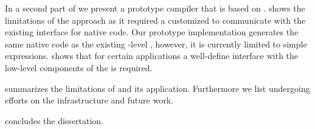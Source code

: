 \begin{description}
	In a second part of  we present \NBJ a prototype \JIT compiler that is based on \B.
	\NBJ shows the limitations of the \B approach as it required a customized \VM to communicate with the existing \JIT interface for native code.
	Our prototype implementation generates the same native code as the existing \VM-level \JIT, however, it is currently limited to simple expressions.
	\NBJ shows that for certain applications a well-define interface with the low-level components of the \VM is required.

\item[\chapref{future}] summarizes the limitations of \B and its application.
Furthermore we list undergoing efforts on the \B infrastructure and future work.

\item[\chapref{conclusion}] concludes the dissertation.

\end{description}



